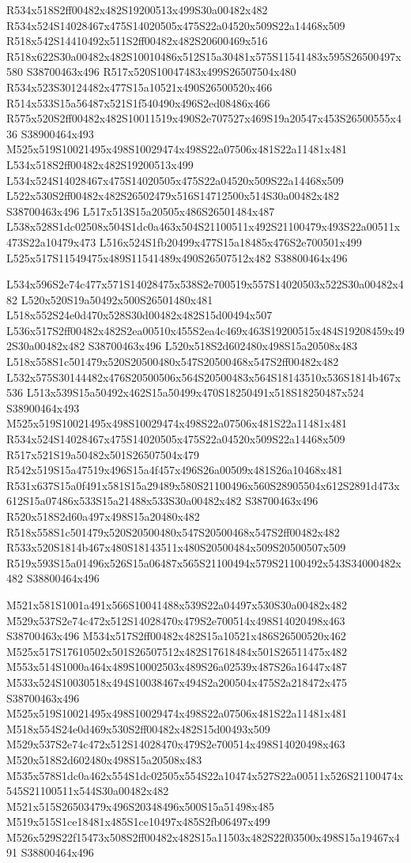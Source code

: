 \documentclass{article}
\begin{document}
\begin{multicols}{2}
R534x518S2ff00482x482S19200513x499S30a00482x482 R534x524S14028467x475S14020505x475S22a04520x509S22a14468x509 R518x542S14410492x511S2ff00482x482S20600469x516 R518x622S30a00482x482S10010486x512S15a30481x575S11541483x595S26500497x580 S38700463x496 R517x520S10047483x499S26507504x480 R534x523S30124482x477S15a10521x490S26500520x466 R514x533S15a56487x521S1f540490x496S2ed08486x466 R575x520S2ff00482x482S10011519x490S2e707527x469S19a20547x453S26500555x436 S38900464x493 M525x519S10021495x498S10029474x498S22a07506x481S22a11481x481 L534x518S2ff00482x482S19200513x499 L534x524S14028467x475S14020505x475S22a04520x509S22a14468x509 L522x530S2ff00482x482S26502479x516S14712500x514S30a00482x482 S38700463x496 L517x513S15a20505x486S26501484x487 L538x528S1dc02508x504S1dc0a463x504S21100511x492S21100479x493S22a00511x473S22a10479x473 L516x524S1fb20499x477S15a18485x476S2e700501x499 L525x517S11549475x489S11541489x490S26507512x482 S38800464x496

L534x596S2e74c477x571S14028475x538S2e700519x557S14020503x522S30a00482x482 L520x520S19a50492x500S26501480x481 L518x552S24e0d470x528S30d00482x482S15d00494x507 L536x517S2ff00482x482S2ea00510x455S2ea4c469x463S19200515x484S19208459x492S30a00482x482 S38700463x496 L520x518S2d602480x498S15a20508x483 L518x558S1c501479x520S20500480x547S20500468x547S2ff00482x482 L532x575S30144482x476S20500506x564S20500483x564S18143510x536S1814b467x536 L513x539S15a50492x462S15a50499x470S18250491x518S18250487x524 S38900464x493 M525x519S10021495x498S10029474x498S22a07506x481S22a11481x481 R534x524S14028467x475S14020505x475S22a04520x509S22a14468x509 R517x521S19a50482x501S26507504x479 R542x519S15a47519x496S15a4f457x496S26a00509x481S26a10468x481 R531x637S15a0f491x581S15a29489x580S21100496x560S28905504x612S2891d473x612S15a07486x533S15a21488x533S30a00482x482 S38700463x496 R520x518S2d60a497x498S15a20480x482 R518x558S1c501479x520S20500480x547S20500468x547S2ff00482x482 R533x520S1814b467x480S18143511x480S20500484x509S20500507x509 R519x593S15a01496x526S15a06487x565S21100494x579S21100492x543S34000482x482 S38800464x496

M521x581S1001a491x566S10041488x539S22a04497x530S30a00482x482 M529x537S2e74c472x512S14028470x479S2e700514x498S14020498x463 S38700463x496 M534x517S2ff00482x482S15a10521x486S26500520x462 M525x517S17610502x501S26507512x482S17618484x501S26511475x482 M553x514S1000a464x489S10002503x489S26a02539x487S26a16447x487 M533x524S10030518x494S10038467x494S2a200504x475S2a218472x475 S38700463x496 M525x519S10021495x498S10029474x498S22a07506x481S22a11481x481 M518x554S24e0d469x530S2ff00482x482S15d00493x509 M529x537S2e74c472x512S14028470x479S2e700514x498S14020498x463 M520x518S2d602480x498S15a20508x483 M535x578S1dc0a462x554S1dc02505x554S22a10474x527S22a00511x526S21100474x545S21100511x544S30a00482x482 M521x515S26503479x496S20348496x500S15a51498x485 M519x515S1ce18481x485S1ce10497x485S2fb06497x499 M526x529S22f15473x508S2ff00482x482S15a11503x482S22f03500x498S15a19467x491 S38800464x496


\end{multicols}
\end{document}
